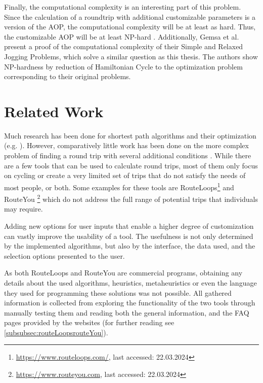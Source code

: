 Finally, the computational complexity is an interesting part of this problem. 
Since the calculation of a roundtrip with additional customizable parameters is a version of the AOP, the computational complexity will be at least as hard.
Thus, the customizable AOP will be at least NP-hard \cite{agarwal_correlated_2023}.
Additionally, Gemsa et al.\ \cite{gemsa_efficient_2013} present a proof of the computational complexity of their Simple and Relaxed Jogging Problems, which solve a similar question as this thesis.
The authors show NP-hardness by reduction of Hamiltonian Cycle to the optimization problem corresponding to their original problems.






\section{Related Work}
\label{sec:relatedWork}


Much research has been done for shortest path algorithms and their optimization (e.g. \cite{cherkassky_shortest_1996, deo_shortest-path_1984, gallo_shortest_1988, sommer_shortest-path_2014, wayahdi_greedy_2021}).
However, comparatively little work has been done on the more complex problem of finding a round trip with several additional conditions  \cite{gemsa_efficient_2013}.
While there are a few tools that can be used to calculate round trips, most of them only focus on cycling or create a very limited set of trips that do not satisfy the needs of most people, or both. 
Some examples for these tools are RouteLoops\footnote{\url{https://www.routeloops.com/}, last accessed: 22.03.2024} and RouteYou \footnote{\url{https://www.routeyou.com}, last accessed: 22.03.2024} which do not address the full range of potential trips that individuals may require.


Adding new options for user inputs that enable a higher degree of customization can vastly improve the usability of a tool. 
The usefulness is not only determined by the implemented algorithms, but also by the interface, the data used, and the selection options presented to the user. 

As both RouteLoops and RouteYou are commercial programs, obtaining any details about the used algorithms, heuristics, metaheuristics or even the language they used for programming these solutions was not possible.
All gathered information is collected from exploring the functionality of the two tools through manually testing them and reading both the general information, and the FAQ pages provided by the websites (for further reading see \ref{subsubsec:routeLoopsrouteYou}). 

